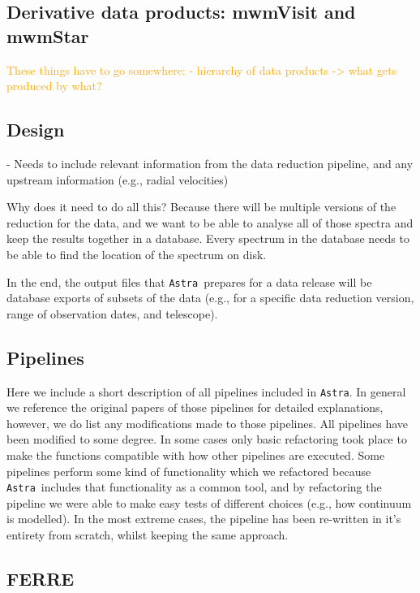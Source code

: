 \documentclass[modern]{aastex631}
\newcommand{\astra}{\texttt{Astra}}
\newcommand{\todo}[1]{\textcolor{orange}{#1}}
\begin{document}
\subsection{Derivative data products: mwmVisit and mwmStar}


\todo{
These things have to go somewhere:
- hierarchy of data products -> what gets produced by what?
}


\subsection{Design}

- Needs to include relevant information from the data reduction pipeline, and any upstream information (e.g., radial velocities)

Why does it need to do all this? 
Because there will be multiple versions of the reduction for the data, and we want to be able to analyse all of those spectra and keep the results together in a database. Every spectrum in the database needs to be able to find the location of the spectrum on disk.

In the end, the output files that \astra\ prepares for a data release will be database exports of subsets of the data (e.g., for a specific data reduction version, range of observation dates, and telescope). 


\subsection{Pipelines}
Here we include a short description of all pipelines included in \astra. 
In general we reference the original papers of those pipelines for detailed explanations, however, we do list any modifications made to those pipelines.
All pipelines have been modified to some degree. In some cases only basic refactoring took place to make the functions compatible with how other pipelines are executed. Some pipelines perform some kind of functionality which we refactored because \astra\ includes that functionality as a common tool, and by refactoring the pipeline we were able to make easy tests of different choices (e.g., how continuum is modelled). In the most extreme cases, the pipeline has been re-written in it's entirety from scratch, whilst keeping the same approach.

\subsection{FERRE} \label{sec:methods-ferre}
\end{document}
